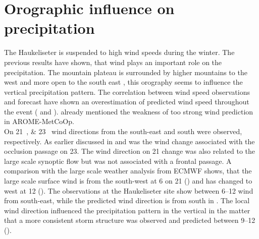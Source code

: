 \section{Orographic influence on precipitation}\label{sec:res:oro_infl}
The Haukeliseter is suspended to high wind speeds during the winter. The previous results have shown, that wind plays an important role on the precipitation. The mountain plateau is surrounded by higher mountains to the west and more open to the south east \citep{wolff_measurements_2013,wolff_derivation_2015}, this orography seems to influence the vertical precipitation pattern. The correlation between wind speed observations and forecast have shown an overestimation of predicted wind speed throughout the event ( and ). \citet{muller_arome-metcoop:_2017} already mentioned the weakness of too strong wind prediction in AROME-MetCoOp.
\\
On \SIlist{21;23}{\dec} wind directions from the south-east and south were observed, respectively. As earlier discussed in  and  was the wind change associated with the occlusion passage on \SI{23}{\dec}. The wind direction on \SI{21}{\dec} change was also related to the large scale synoptic flow but was not associated with a frontal passage. A comparison with the large scale weather analysis from ECMWF shows, that the large scale surface wind is from the south-west at \SI{6}{\UTC} on \SI{21}{\dec} () and has changed to west at \SI{12}{\UTC} (). The observations at the Haukeliseter site show between \SIrange{6}{12}{\UTC} wind from south-east, while the predicted wind direction is from south in . The local wind direction influenced the precipitation pattern in the vertical in the matter that a more consistent storm structure was observed and predicted between \SIrange{9}{12} {\UTC} (). 
